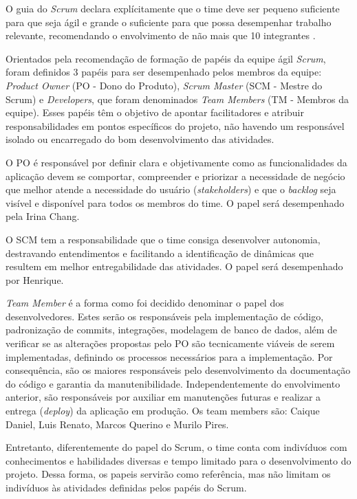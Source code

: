 \documentclass[
    12pt,               %
    openright,          %
    oneside,
    a4paper,            %
    BIBLATEX,           %
    TODO,               %
    english,            %
    brazil              %
    ]{ifsp-spo-inf-ctds}
\begin{document}
            O guia do \emph{Scrum} declara explícitamente que o time deve ser pequeno suficiente para que seja ágil e grande o suficiente para que possa desempenhar trabalho relevante, recomendando o envolvimento de não mais que 10 integrantes .
            
            Orientados pela recomendação de formação de papéis da equipe ágil \emph{Scrum}, foram definidos 3 papéis para ser desempenhado pelos membros da equipe: \emph{Product Owner} (PO -  Dono do Produto), \emph{Scrum Master} (SCM - Mestre do Scrum) e \emph{Developers}, que foram denominados \emph{Team Members} (TM - Membros da equipe). Esses papéis têm o objetivo de apontar facilitadores e atribuir responsabilidades em pontos específicos do projeto, não havendo um responsável isolado ou encarregado do bom desenvolvimento das atividades. 
            
            O PO é responsável por definir clara e objetivamente como as funcionalidades da aplicação devem se comportar, compreender e priorizar a necessidade de negócio que melhor atende a necessidade do usuário (\emph{stakeholders}) e que o \emph{backlog }seja visível e disponível para todos os membros do time. O papel será desempenhado pela Irina Chang.
            
            O SCM tem a responsabilidade que o time consiga desenvolver autonomia, destravando entendimentos e facilitando a identificação de dinâmicas que resultem em melhor entregabilidade das atividades. O papel será desempenhado por Henrique.
            
            \emph{Team Member} é a forma como foi decidido denominar o papel dos desenvolvedores. Estes serão os responsáveis pela implementação de código, padronização de commits, integrações, modelagem de banco de dados, além de verificar se as alterações propostas pelo PO são tecnicamente viáveis de serem implementadas, definindo os processos necessários para a implementação. Por consequência, são os maiores responsáveis pelo desenvolvimento da documentação do código e garantia da manutenibilidade. Independentemente do envolvimento anterior, são responsáveis por auxiliar em  manutenções futuras e realizar a entrega (\emph{deploy}) da aplicação em produção. Os team members são: Caique Daniel, Luis Renato, Marcos Querino e Murilo Pires.
            
            Entretanto, diferentemente do papel do Scrum, o time conta com indivíduos com conhecimentos e habilidades diversas e tempo limitado para o desenvolvimento do projeto. Dessa forma, os papeis servirão como referência, mas não limitam os indivíduos às atividades definidas pelos papéis do Scrum.
            
\end{document}
